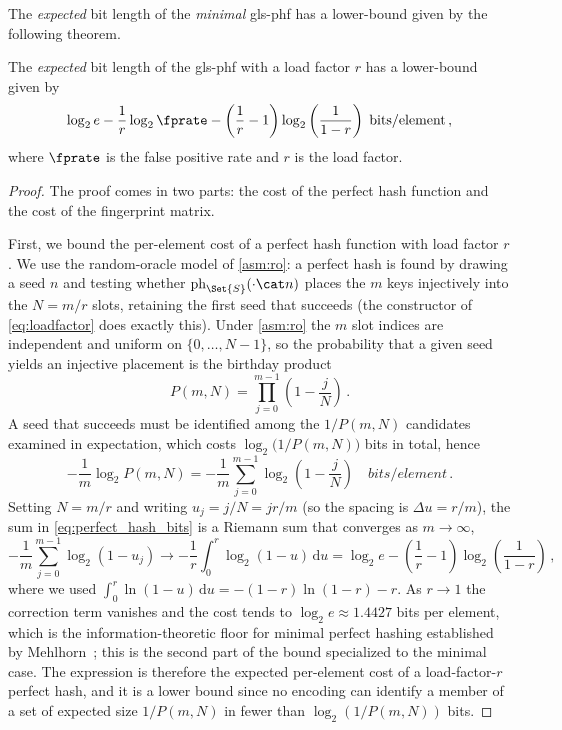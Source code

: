 \documentclass[ ../main.tex]{subfiles}
\begin{document}
The \emph{expected} bit length of the \emph{minimal} \gls{gls-phf} has a lower-bound given by the following theorem.
\begin{theorem}
\label{thm:mPHF_size}
The \emph{expected} bit length of the \gls{gls-phf} with a load factor $r$ has a lower-bound given by
\begin{equation}
\label{eq:mPHF_size}
    \log_2 e - \frac{1}{r} \log_2 \fprate - \left(\frac{1}{r} - 1\right) \log_2\left(\frac{1}{1-r}\right)\; \si{bits \per element}\,,
\end{equation}
where $\fprate$ is the false positive rate and $r$ is the load factor.
\end{theorem}
\begin{proof}
The proof comes in two parts: the cost of the perfect hash function and the cost of the fingerprint matrix.

First, we bound the per-element cost of a perfect hash function with load factor $r$. We use the random-oracle model of \cref{asm:ro}: a perfect hash is found by drawing a seed $n$ and testing whether $\ph_{\Set{S}}(\cdot \cat n)$ places the $m$ keys injectively into the $N = m/r$ slots, retaining the first seed that succeeds (the constructor of \cref{eq:loadfactor} does exactly this). Under \cref{asm:ro} the $m$ slot indices are independent and uniform on $\{0,\ldots,N-1\}$, so the probability that a given seed yields an injective placement is the birthday product
\begin{equation}
\label{eq:perfect_hash_prob}
    P(m,N) = \prod_{j=0}^{m-1}\left(1 - \frac{j}{N}\right)\,.
\end{equation}
A seed that succeeds must be identified among the $1/P(m,N)$ candidates examined in expectation, which costs $\log_2\!\bigl(1/P(m,N)\bigr)$ bits in total, hence
\begin{equation}
\label{eq:perfect_hash_bits}
    -\frac{1}{m}\log_2 P(m,N)
    = -\frac{1}{m}\sum_{j=0}^{m-1} \log_2\!\left(1 - \frac{j}{N}\right)
    \quad \si{bits \per element}\,.
\end{equation}
Setting $N = m/r$ and writing $u_j = j/N = jr/m$ (so the spacing is $\Delta u = r/m$), the sum in \cref{eq:perfect_hash_bits} is a Riemann sum that converges as $m \to \infty$,
\begin{equation}
    -\frac{1}{m}\sum_{j=0}^{m-1}\log_2(1 - u_j)
    \longrightarrow
    -\frac{1}{r}\int_{0}^{r}\log_2(1-u)\,\mathrm{d}u
    = \log_2 e - \left(\frac{1}{r} - 1\right)\log_2\!\left(\frac{1}{1-r}\right)\,,
\end{equation}
where we used $\int_0^r \ln(1-u)\,\mathrm{d}u = -(1-r)\ln(1-r) - r$. As $r \to 1$ the correction term vanishes and the cost tends to $\log_2 e \approx \num{1.4427}$ bits per element, which is the information-theoretic floor for minimal perfect hashing established by Mehlhorn~\cite{mehlhorn1982}; this is the second part of the bound specialized to the minimal case. The expression is therefore the expected per-element cost of a load-factor-$r$ perfect hash, and it is a lower bound since no encoding can identify a member of a set of expected size $1/P(m,N)$ in fewer than $\log_2(1/P(m,N))$ bits.


\end{proof}
\end{document}
